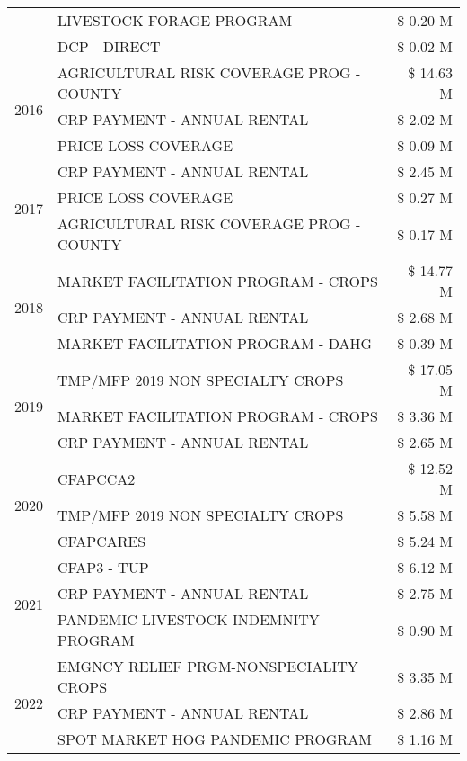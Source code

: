 \begin{tabular}{llr}
 & LIVESTOCK FORAGE PROGRAM & \$ 0.20 M \\
 & DCP - DIRECT & \$ 0.02 M \\
\cline{1-3}
\multirow[t]{3}{*}{2016} & AGRICULTURAL RISK COVERAGE PROG - COUNTY & \$ 14.63 M \\
 & CRP PAYMENT - ANNUAL RENTAL & \$ 2.02 M \\
 & PRICE LOSS COVERAGE & \$ 0.09 M \\
\cline{1-3}
\multirow[t]{3}{*}{2017} & CRP PAYMENT - ANNUAL RENTAL & \$ 2.45 M \\
 & PRICE LOSS COVERAGE & \$ 0.27 M \\
 & AGRICULTURAL RISK COVERAGE PROG - COUNTY & \$ 0.17 M \\
\cline{1-3}
\multirow[t]{3}{*}{2018} & MARKET FACILITATION PROGRAM - CROPS & \$ 14.77 M \\
 & CRP PAYMENT - ANNUAL RENTAL & \$ 2.68 M \\
 & MARKET FACILITATION PROGRAM - DAHG & \$ 0.39 M \\
\cline{1-3}
\multirow[t]{3}{*}{2019} & TMP/MFP 2019 NON SPECIALTY CROPS & \$ 17.05 M \\
 & MARKET FACILITATION PROGRAM - CROPS & \$ 3.36 M \\
 & CRP PAYMENT - ANNUAL RENTAL & \$ 2.65 M \\
\cline{1-3}
\multirow[t]{3}{*}{2020} & CFAPCCA2 & \$ 12.52 M \\
 & TMP/MFP 2019 NON SPECIALTY CROPS & \$ 5.58 M \\
 & CFAPCARES & \$ 5.24 M \\
\cline{1-3}
\multirow[t]{3}{*}{2021} & CFAP3 - TUP & \$ 6.12 M \\
 & CRP PAYMENT - ANNUAL RENTAL & \$ 2.75 M \\
 & PANDEMIC LIVESTOCK INDEMNITY PROGRAM & \$ 0.90 M \\
\cline{1-3}
\multirow[t]{3}{*}{2022} & EMGNCY RELIEF PRGM-NONSPECIALITY CROPS & \$ 3.35 M \\
 & CRP PAYMENT - ANNUAL RENTAL & \$ 2.86 M \\
 & SPOT MARKET HOG PANDEMIC PROGRAM & \$ 1.16 M \\
\cline{1-3}
\bottomrule
\end{tabular}
